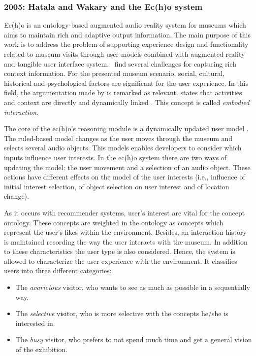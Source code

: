 \subsubsection{2005: Hatala and Wakary and the Ec(h)o system}
\label{sec:hatala}

Ec(h)o is an ontology-based augmented audio reality system for museums which 
aims to maintain rich and adaptive output information. The main purpose of this 
work is to address the problem of supporting experience design and functionality 
related to museum visits through user models combined with augmented reality 
and tangible user interface system.~\citet{hatala_ontology_based_2005} find
several challenges for capturing rich context information. For the presented 
museum scenario, social, cultural, historical and psychological factors are 
significant for the user experience. In this field, the argumentation made by
is remarked as relevant. \citeauthor{dourish_what_2004} states that activities 
and context are directly and dynamically linked \citet{dourish_what_2004}\citep{dourish_where_2004}.
This concept is called \textit{embodied interaction}.

The core of the ec(h)o's reasoning module is a dynamically updated user model
\citep{wahlster1989user}. The ruled-based model changes as the user moves 
through the museum and selects several audio objects. This models enables 
developers to consider which inputs influence user interests. In the ec(h)o 
system there are two ways of updating the model: the user movement and a 
selection of an audio object. These actions have different effects on the model 
of the user interests (i.e., influence of initial interest selection, of object 
selection on user interest and of location change). 

As it occurs with recommender systems, user's interest are vital for the concept
ontology. These concepts are weighted in the ontology as concepts which represent
the user's likes within the environment. Besides, an interaction history is 
maintained recording the way the user interacts with the museum. In addition to 
these characteristics the user type is also considered. Hence, the system is 
allowed to characterize the user experience with the environment. It classifies 
users into three different categories:

\begin{itemize}
  \item The \textit{avaricious} visitor, who wants to see as much as possible
  in a sequentially way.
  \item The \textit{selective} visitor, who is more selective with the concepts 
  he/she is interested in.
  \item The \textit{busy} visitor, who prefers to not spend much time and get a 
  general vision of the exhibition.
\end{itemize}
